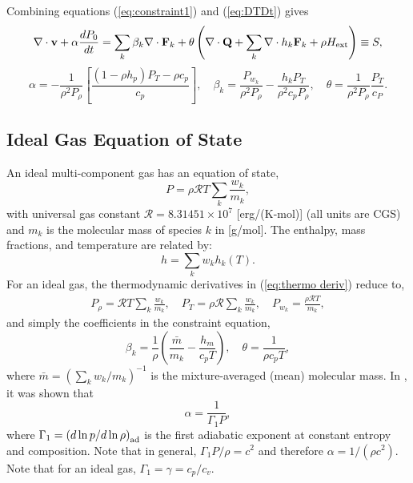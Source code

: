 \documentclass[final]{siamltex}
\def\Fb {{\bf F}}
\def\Qb {{\bf Q}}
\def\vb {{\bf v}}
\def\Hext {H_{\rm ext}}
\begin{document}
Combining equations (\ref{eq:constraint1}) and (\ref{eq:DTDt}) gives
\begin{equation}
\nabla\cdot\vb + \alpha\frac{dP_0}{dt} = \sum_k \beta_k \nabla\cdot\Fb_k + \theta\left(\nabla\cdot\Qb + \sum_k\nabla\cdot h_k\Fb_k + \rho\Hext\right) \equiv S,\label{eq:constraint}
\end{equation}
\begin{equation}
\alpha = -\frac{1}{\rho^2 P_\rho}\left[\frac{(1-\rho h_p)P_T - \rho c_p}{c_p}\right], \quad
\beta_k = \frac{P_{w_k}}{\rho^2 P_\rho} - \frac{h_k P_T}{\rho^2 c_p P_\rho}, \quad
\theta = \frac{1}{\rho^2 P_\rho}\frac{P_T}{c_P}.\label{eq:thermo deriv}
\end{equation}

\subsection{Ideal Gas Equation of State}
An ideal multi-component gas has an equation of state,
\begin{equation}
P = \rho\mathcal{R}T\sum_k\frac{w_k}{m_k},
\end{equation}
with universal gas constant $\mathcal{R} = 8.31451\times 10^7$ [erg/(K-mol)] 
(all units are CGS) and $m_k$ is the molecular mass of species $k$ in [g/mol].
The enthalpy, mass fractions, and temperature are related by:
\begin{equation}
h = \sum_k w_k h_k(T).
\end{equation}
For an ideal gas, the thermodynamic derivatives in (\ref{eq:thermo deriv})
reduce to,
\begin{eqnarray}
P_\rho = \mathcal{R} T\sum_k\frac{w_k}{m_k}, \quad
P_T = \rho\mathcal{R}\sum_k\frac{w_k}{m_k}, \quad
P_{w_k} = \frac{\rho\mathcal{R}T}{m_k},
\end{eqnarray}
and simply the coefficients in the constraint equation,
\begin{equation}
\beta_k = \frac{1}{\rho}\left(\frac{\bar{m}}{m_k} - \frac{h_m}{c_p T}\right), \quad
\theta = \frac{1}{\rho c_p T},
\end{equation}
where $\bar{m} = (\sum_k w_k/m_k)^{-1}$ is the mixture-averaged (mean) molecular mass.
In \cite{MAESTROI}, it was shown that
\begin{equation}
\alpha = \frac{1}{\Gamma_1 P},
\end{equation}
where $\Gamma_1 = \left(d\ln{p}/d\ln{\rho}\right)_{\rm ad}$ is the first adiabatic exponent
at constant entropy and composition.  Note that in general, $\Gamma_1 P/\rho = c^2$ and
therefore $\alpha = 1/(\rho c^2)$.
Note that for an ideal gas, $\Gamma_1 = \gamma = c_p/c_v$.
\end{document}
